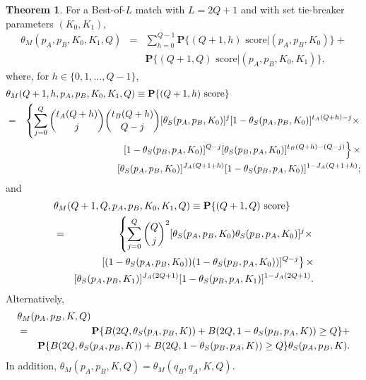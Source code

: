 \documentclass[11pt]{article}
\theoremstyle{plain}
\theoremstyle{definition}
\newtheorem{theorem}{Theorem}[section]
\renewcommand{\Pr}{\mathbf{P}}
\begin{document}
\begin{theorem}
    For a Best-of-$L$ match with $L = 2Q +1$ and with set tie-breaker parameters $(K_0,K_1)$, 
    \begin{eqnarray*}
    \theta_M(p_A,p_B,K_0,K_1,Q) & = &
    \sum_{h=0}^{Q-1} \Pr\{\mbox{$(Q+1,h)$ score} | (p_A,p_B,K_0)\} + \\ && \Pr\{\mbox{$(Q+1,Q)$ score} | (p_A,p_B,K_0,K_1)\},    
    \end{eqnarray*}
where, for $h \in \{0,1,\ldots,Q-1\}$,
%
\begin{eqnarray*}
    \lefteqn{\theta_M(Q+1,h,p_A,p_B,K_0,K_1,Q) \equiv \Pr\{\mbox{$(Q+1,h)$ score}\}  } \\
    & = & \left\{
    \sum_{j=0}^Q {{t_A(Q+h)} \choose j} {{t_B(Q+h)} \choose {Q-j}} 
    [\theta_S(p_A,p_B,K_0)]^j [1 - \theta_S(p_A,p_B,K_0)]^{t_A(Q+h) - j} \times \right. \\ && \left.
    [1 - \theta_S(p_B,p_A,K_0)]^{Q-j} [\theta_S(p_B,p_A,K_0)]^{t_B(Q+h) - (Q-j)} \right\} \times \\
    && [\theta_S(p_A,p_B,K_0)]^{J_A(Q+1+h)} [1 - \theta_S(p_B,p_A,K_0)]^{1 - J_A(Q+1+h)};
\end{eqnarray*}
and
%
\begin{eqnarray*}
    \lefteqn{ \theta_M(Q+1,Q,p_A,p_B,K_0,K_1,Q) \equiv \Pr\{\mbox{$(Q+1,Q)$ score}\}  } \\
    & = & \left\{
    \sum_{j=0}^Q {{Q} \choose j}^2 [\theta_S(p_A,p_B,K_0)\theta_S(p_B,p_A,K_0)]^j \times \right. \\
    && \left.
     [(1 - \theta_S(p_A,p_B,K_0))(1 - \theta_S(p_B,p_A,K_0))]^{Q - j}  \right\} \times \\
    && [\theta_S(p_A,p_B,K_1)]^{J_A(2Q+1)} [1 - \theta_S(p_B,p_A,K_1)]^{1 - J_A(2Q+1)}.
\end{eqnarray*}
%
Alternatively,
%
\begin{eqnarray*}
\lefteqn{\theta_M(p_A,p_B,K,Q)   } \\ & = &
\Pr\{B(2Q,\theta_S(p_A,p_B,K)) +  B(2Q,1-\theta_S(p_B,p_A,K)) \ge Q\} +  \\ &&
\Pr\{B(2Q,\theta_S(p_A,p_B,K)) + B(2Q,1-\theta_S(p_B,p_A,K)) \ge Q\} \theta_S(p_A,p_B,K).
\end{eqnarray*}
%
In addition, $\theta_M(p_A,p_B,K,Q) = \theta_M(q_B,q_A,K,Q)$.
%
\end{theorem}
\end{document}
